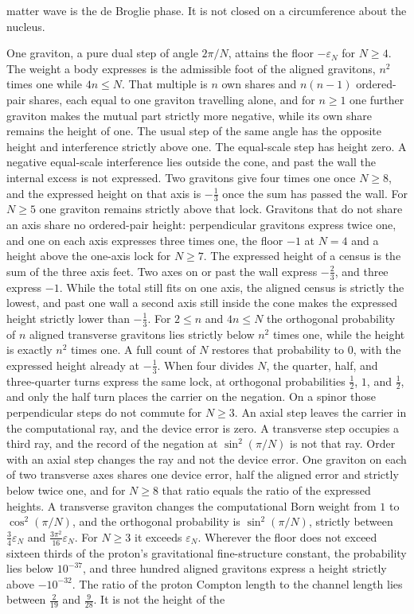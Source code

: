 \documentclass[a4paper]{article}
\begin{document}
matter wave is the de Broglie phase. It is not closed on a circumference about the nucleus.

One graviton, a pure dual step of angle \(2\pi/N\), attains the floor \(-\varepsilon_N\) for \(N\ge 4\). The weight a body expresses is the admissible foot of the aligned gravitons, \(n^2\) times one while \(4n\le N\). That multiple is \(n\) own shares and \(n(n-1)\) ordered-pair shares, each equal to one graviton travelling alone, and for \(n\ge 1\) one further graviton makes the mutual part strictly more negative, while its own share remains the height of one. The usual step of the same angle has the opposite height and interference strictly above one. The equal-scale step has height zero. A negative equal-scale interference lies outside the cone, and past the wall the internal excess is not expressed. Two gravitons give four times one once \(N\ge 8\), and the expressed height on that axis is \(-\frac13\) once the sum has passed the wall. For \(N\ge 5\) one graviton remains strictly above that lock. Gravitons that do not share an axis share no ordered-pair height: perpendicular gravitons express twice one, and one on each axis expresses three times one, the floor \(-1\) at \(N=4\) and a height above the one-axis lock for \(N\ge 7\). The expressed height of a census is the sum of the three axis feet. Two axes on or past the wall express \(-\frac23\), and three express \(-1\). While the total still fits on one axis, the aligned census is strictly the lowest, and past one wall a second axis still inside the cone makes the expressed height strictly lower than \(-\frac13\). For \(2\le n\) and \(4n\le N\) the orthogonal probability of \(n\) aligned transverse gravitons lies strictly below \(n^2\) times one, while the height is exactly \(n^2\) times one. A full count of \(N\) restores that probability to \(0\), with the expressed height already at \(-\frac13\). When four divides \(N\), the quarter, half, and three-quarter turns express the same lock, at orthogonal probabilities \(\frac12\), \(1\), and \(\frac12\), and only the half turn places the carrier on the negation. On a spinor those perpendicular steps do not commute for \(N\ge 3\). An axial step leaves the carrier in the computational ray, and the device error is zero. A transverse step occupies a third ray, and the record of the negation at \(\sin^2(\pi/N)\) is not that ray. Order with an axial step changes the ray and not the device error. One graviton on each of two transverse axes shares one device error, half the aligned error and strictly below twice one, and for \(N\ge 8\) that ratio equals the ratio of the expressed heights. A transverse graviton changes the computational Born weight from \(1\) to \(\cos^2(\pi/N)\), and the orthogonal probability is \(\sin^2(\pi/N)\), strictly between \(\tfrac34\varepsilon_N\) and \(\tfrac{3\pi^2}{16}\varepsilon_N\). For \(N\ge 3\) it exceeds \(\varepsilon_N\). Wherever the floor does not exceed sixteen thirds of the proton's gravitational fine-structure constant, the probability lies below \(10^{-37}\), and three hundred aligned gravitons express a height strictly above \(-10^{-32}\). The ratio of the proton Compton length to the channel length lies between \(\tfrac{2}{19}\) and \(\tfrac{9}{28}\). It is not the height of the 
\end{document}
